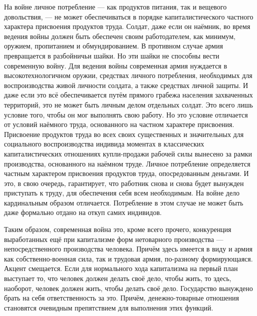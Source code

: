 \documentclass[12pt,a4paper,openany]{book}
\begin{document}
На войне личное потребление — как продуктов питания, так и вещевого довольствия, — не может обеспечиваться в порядке капиталистического частного характера присвоения продуктов труда. Солдат, даже если он наёмник, во время ведения войны должен быть обеспечен своим работодателем, как минимум, оружием, пропитанием и обмундированием. В противном случае армия превращается в разбойничьи шайки. Но эти шайки не способны вести современную войну. Для ведения войны современная армия нуждается в высокотехнологичном оружии, средствах личного потребления, необходимых для воспроизводства живой личности солдата, а также средствах личной защиты. И даже если это всё обеспечивается путём прямого грабежа населения захваченных территорий, это не может быть личным делом отдельных солдат. Это всего лишь условие того, чтобы он мог выполнять свою работу. Но это условие отличается от условий наёмного труда, основанного на частном характере присвоения. Присвоение продуктов труда во всех своих существенных и значительных для социального воспроизводства индивида моментах в классических капиталистических отношениях купли-продажи рабочей силы вынесено за рамки производства, основанного на наёмном труде. Личное потребление определяется частным характером присвоения продуктов труда, опосредованным деньгами. И это, в свою очередь, гарантирует, что работник снова и снова будет вынужден приступать к труду, для обеспечения себя всем необходимым. На войне дело кардинальным образом отличается. Потребление в этом случае не может быть даже формально отдано на откуп самих индивидов.

Таким образом, современная война это, кроме всего прочего, конкуренция выработанных ещё при капитализме форм нетоварного производства — непосредственного производства человека. Причём здесь имеется в виду и армия как собственно-военная сила, так и трудовая армия, по-разному формирующаяся. Акцент смещается. Если для нормального хода капитализма на первый план выступает то, что человек должен делать своё дело, чтобы жить, то здесь, наоборот, человек должен жить, чтобы делать своё дело. Государство вынуждено брать на себя ответственность за это. Причём, денежно-товарные отношения становятся очевидным препятствием для выполнения этих функций.
\end{document}
